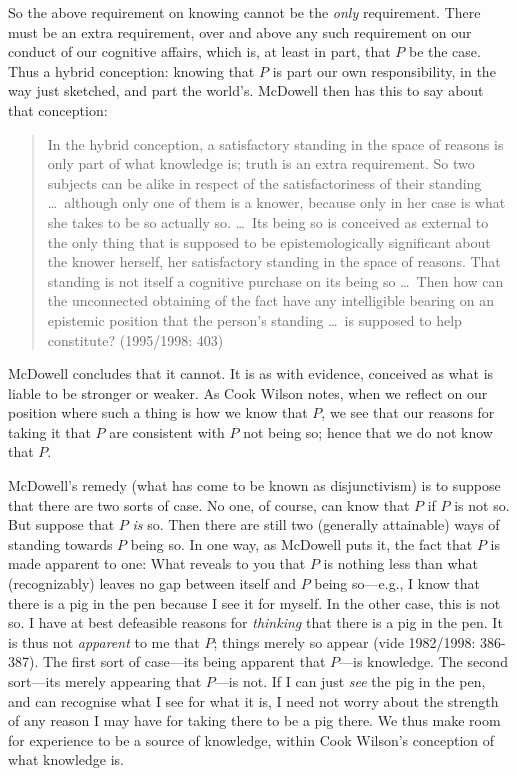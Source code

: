 So the above requirement on knowing cannot be the \emph{only} requirement. There must be an extra requirement, over and above any such requirement on our conduct of our cognitive affairs, which is, at least in part, that \( P \) be the case. Thus a hybrid conception: knowing that \( P \) is part our own responsibility, in the way just sketched, and part the world’s. McDowell then has this to say about that conception:
\begin{quote}
	In the hybrid conception, a satisfactory standing in the space of reasons is only part of what knowledge is; truth is an extra requirement. So two subjects can be alike in respect of the satisfactoriness of their standing \ldots\ although only one of them is a knower, because only in her case is what she takes to be so actually so. \ldots\ Its being so is conceived as external to the only thing that is supposed to be epistemologically significant about the knower herself, her satisfactory standing in the space of reasons. That standing is not itself a cognitive purchase on its being so \ldots\ Then how can the unconnected obtaining of the fact have any intelligible bearing on an epistemic position that the person’s standing \ldots\ is supposed to help constitute? (1995/1998: 403)
\end{quote}
McDowell concludes that it cannot. It is as with evidence, conceived as what is liable to be stronger or weaker. As Cook Wilson notes, when we reflect on our position where such a thing is how we know that \( P \), we see that our reasons for taking it that \( P \) are consistent with \( P \) not being so; hence that we do not know that \( P \).

McDowell’s remedy (what has come to be known as disjunctivism) is to suppose that there are two sorts of case. No one, of course, can know that \( P \) if \( P \) is not so. But suppose that \( P \) \emph{is} so. Then there are still two (generally attainable) ways of standing towards \( P \) being so. In one way, as McDowell puts it, the fact that \( P \) is made apparent to one: What reveals to you that \( P \) is nothing less than what (recognizably) leaves no gap between itself and \( P \) being so---e.g., I know that there is a pig in the pen because I see it for myself. In the other case, this is not so. I have at best defeasible reasons for \emph{thinking} that there is a pig in the pen. It is thus not \emph{apparent} to me that \( P \); things merely so appear (vide 1982/1998: 386-387). The first sort of case---its being apparent that \( P \)---is knowledge. The second sort---its merely appearing that \( P \)---is not. If I can just \emph{see} the pig in the pen, and can recognise what I see for what it is, I need not worry about the strength of any reason I may have for taking there to be a pig there. We thus make room for experience to be a source of knowledge, within Cook Wilson’s conception of what knowledge is.

